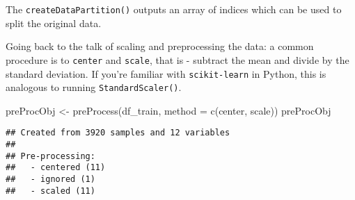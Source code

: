 \documentclass[
]{book}
\newenvironment{Shaded}{\begin{snugshade}}{\end{snugshade}}
\newcommand{\AttributeTok}[1]{\textcolor[rgb]{0.77,0.63,0.00}{#1}}
\newcommand{\ConstantTok}[1]{\textcolor[rgb]{0.00,0.00,0.00}{#1}}
\newcommand{\DecValTok}[1]{\textcolor[rgb]{0.00,0.00,0.81}{#1}}
\newcommand{\FunctionTok}[1]{\textcolor[rgb]{0.00,0.00,0.00}{#1}}
\newcommand{\NormalTok}[1]{#1}
\newcommand{\OtherTok}[1]{\textcolor[rgb]{0.56,0.35,0.01}{#1}}
\newcommand{\SpecialCharTok}[1]{\textcolor[rgb]{0.00,0.00,0.00}{#1}}
\newcommand{\StringTok}[1]{\textcolor[rgb]{0.31,0.60,0.02}{#1}}
\begin{document}
\begin{Shaded}
\end{Shaded}

The \texttt{createDataPartition()} outputs an array of indices which can be used to split the original data.

Going back to the talk of scaling and preprocessing the data: a common procedure is to \texttt{center} and \texttt{scale}, that is - subtract the mean and divide by the standard deviation. If you're familiar with \texttt{scikit-learn} in Python, this is analogous to running \texttt{StandardScaler()}.

\begin{Shaded}
\begin{Highlighting}[]
\NormalTok{preProcObj }\OtherTok{\textless{}{-}} \FunctionTok{preProcess}\NormalTok{(df\_train, }\AttributeTok{method =} \FunctionTok{c}\NormalTok{(}\StringTok{\textquotesingle{}center\textquotesingle{}}\NormalTok{, }\StringTok{\textquotesingle{}scale\textquotesingle{}}\NormalTok{))}
\NormalTok{preProcObj}
\end{Highlighting}
\end{Shaded}

\begin{verbatim}
## Created from 3920 samples and 12 variables
## 
## Pre-processing:
##   - centered (11)
##   - ignored (1)
##   - scaled (11)
\end{verbatim}
\end{document}
